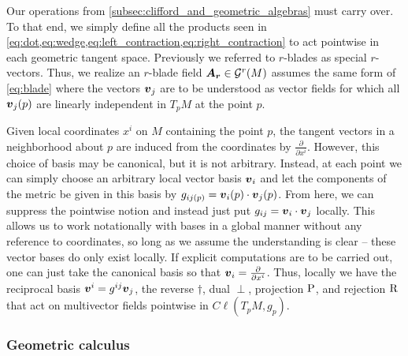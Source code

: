 Our operations from \cref{subsec:clifford_and_geometric_algebras} must carry over. To that end, we simply define all the products seen in \cref{eq:dot,eq:wedge,eq:left_contraction,eq:right_contraction} to act pointwise in each geometric tangent space. Previously we referred to $r$-blades as special $r$-vectors. Thus, we realize an $r$-blade field $\boldsymbol{A_r} \in \mathcal{G}^r(M)$ assumes the same form of \cref{eq:blade} where the vectors $\boldsymbol{v}_j$ are to be understood as vector fields for which all $\boldsymbol{v}_j(p)$ are linearly independent in $T_pM$ at the point $p$.

Given local coordinates $x^i$ on $M$ containing the point $p$, the tangent vectors in a neighborhood about $p$ are induced from the coordinates by $\frac{\partial}{\partial x^i}$. However, this choice of basis may be canonical, but it is not arbitrary. Instead, at each point we can simply choose an arbitrary local vector basis $\boldsymbol{v}_i$ and let the components of the metric be given in this basis by $g_{{ij}(p)} = \boldsymbol{v}_i(p)\cdot \boldsymbol{v}_j(p)$. From here, we can suppress the pointwise notion and instead just put $g_{ij}=\boldsymbol{v}_i\cdot \boldsymbol{v}_j$ locally. This allows us to work notationally with bases in a global manner without any reference to coordinates, so long as we assume the understanding is clear -- these vector bases do only exist locally. If explicit computations are to be carried out, one can just take the canonical basis so that $\boldsymbol{v}_i=\frac{\partial}{\partial x^i}$. Thus, locally we have the reciprocal basis $\boldsymbol{v}^i=g^{ij}\boldsymbol{v}_j$, the reverse $\dagger$, dual $\perp$, projection $\operatorname{P}$, and rejection $\operatorname{R}$ that act on multivector fields pointwise in $C\ell(T_pM,g_p)$. 

\subsubsection{Geometric calculus}

